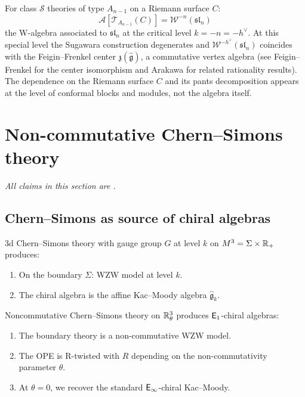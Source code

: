 \begin{example}\label{ex:class-s}
For class $\mathcal{S}$ theories of type $A_{n-1}$ on a Riemann surface $C$:
\[
\mathcal{A}[\mathcal{T}_{A_{n-1}}(C)] = \mathcal{W}^{-n}(\mathfrak{sl}_n)
\]
the W-algebra associated to $\mathfrak{sl}_n$ at the critical level $k = -n = -h^\vee$. At this special level the Sugawara construction degenerates and $\mathcal{W}^{-h^\vee}(\mathfrak{sl}_n)$ coincides with the Feigin--Frenkel center $\mathfrak{z}(\widehat{\mathfrak{g}})$, a commutative vertex algebra (see Feigin--Frenkel \cite{FF} for the center isomorphism and Arakawa \cite{Ara15} for related rationality results). The dependence on the Riemann surface $C$ and its pants decomposition appears at the level of conformal blocks and modules, not the algebra itself.
\end{example}


\section{Non-commutative Chern--Simons theory}
\label{sec:nc-chern-simons}
\noindent\emph{All claims in this section are \ClaimStatusConjectured.}

\subsection{Chern--Simons as source of chiral algebras}

\begin{construction}\label{constr:cs-boundary}
3d Chern--Simons theory with gauge group $G$ at level $k$ on $M^3 = \Sigma \times \mathbb{R}_+$ 
produces:
\begin{enumerate}[label=(\roman*)]
\item On the boundary $\Sigma$: WZW model at level $k$.
\item The chiral algebra is the affine Kac--Moody algebra $\hat{\mathfrak{g}}_k$.
\end{enumerate}
\end{construction}

\begin{conjecture}\label{conj:nc-cs}
Noncommutative Chern--Simons theory on $\mathbb{R}^3_\theta$ produces
$\mathsf{E}_1$-chiral algebras:
\begin{enumerate}[label=(\roman*)]
\item The boundary theory is a non-commutative WZW model.
\item The OPE is R-twisted with $R$ depending on the non-commutativity parameter $\theta$.
\item At $\theta = 0$, we recover the standard $\mathsf{E}_{\infty}$-chiral Kac--Moody.
\end{enumerate}
\end{conjecture}


